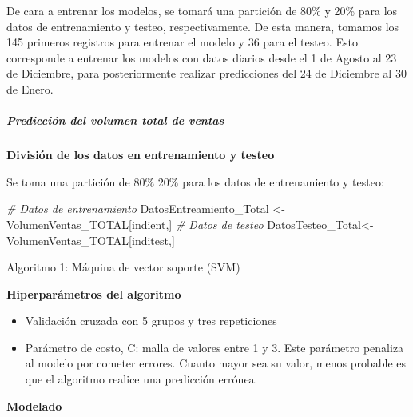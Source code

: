 \documentclass[
]{article}
\newenvironment{Shaded}{\begin{snugshade}}{\end{snugshade}}
\newcommand{\CommentTok}[1]{\textcolor[rgb]{0.56,0.35,0.01}{\textit{#1}}}
\newcommand{\NormalTok}[1]{#1}
\newcommand{\OtherTok}[1]{\textcolor[rgb]{0.56,0.35,0.01}{#1}}
\providecommand{\tightlist}{%
  \setlength{\itemsep}{0pt}\setlength{\parskip}{0pt}}
\begin{document}
De cara a entrenar los modelos, se tomará una partición de 80\% y 20\%
para los datos de entrenamiento y testeo, respectivamente. De esta
manera, tomamos los 145 primeros registros para entrenar el modelo y 36
para el testeo. Esto corresponde a entrenar los modelos con datos
diarios desde el 1 de Agosto al 23 de Diciembre, para posteriormente
realizar predicciones del 24 de Diciembre al 30 de Enero.

\hypertarget{predicciuxf3n-del-volumen-total-de-ventas}{%
\subparagraph{Predicción del volumen total de
ventas}\label{predicciuxf3n-del-volumen-total-de-ventas}}

\textbf{División de los datos en entrenamiento y testeo}

Se toma una partición de 80\% 20\% para los datos de entrenamiento y
testeo:

\begin{Shaded}
\begin{Highlighting}[]
\CommentTok{\# Datos de entrenamiento}
\NormalTok{DatosEntreamiento\_Total }\OtherTok{\textless{}{-}}\NormalTok{ VolumenVentas\_TOTAL[indient,]}
\CommentTok{\# Datos de testeo}
\NormalTok{DatosTesteo\_Total}\OtherTok{\textless{}{-}}\NormalTok{VolumenVentas\_TOTAL[inditest,]}
\end{Highlighting}
\end{Shaded}

Algoritmo 1: Máquina de vector soporte (SVM)

\textbf{Hiperparámetros del algoritmo}

\begin{itemize}
\tightlist
\item
  Validación cruzada con 5 grupos y tres repeticiones
\item
  Parámetro de costo, C: malla de valores entre 1 y 3. Este parámetro
  penaliza al modelo por cometer errores. Cuanto mayor sea su valor,
  menos probable es que el algoritmo realice una predicción errónea.
\end{itemize}

\textbf{Modelado}
\end{document}
